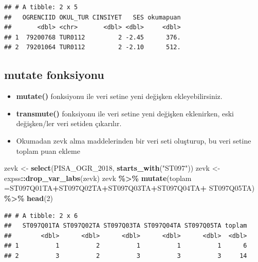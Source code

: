 \documentclass[
  oneside]{book}
\newenvironment{Shaded}{\begin{snugshade}}{\end{snugshade}}
\newcommand{\AttributeTok}[1]{\textcolor[rgb]{0.13,0.29,0.53}{#1}}
\newcommand{\DecValTok}[1]{\textcolor[rgb]{0.00,0.00,0.81}{#1}}
\newcommand{\FunctionTok}[1]{\textcolor[rgb]{0.13,0.29,0.53}{\textbf{#1}}}
\newcommand{\NormalTok}[1]{#1}
\newcommand{\OtherTok}[1]{\textcolor[rgb]{0.56,0.35,0.01}{#1}}
\newcommand{\SpecialCharTok}[1]{\textcolor[rgb]{0.81,0.36,0.00}{\textbf{#1}}}
\newcommand{\StringTok}[1]{\textcolor[rgb]{0.31,0.60,0.02}{#1}}
\begin{document}
\begin{verbatim}
## # A tibble: 2 x 5
##   OGRENCIID OKUL_TUR CINSIYET   SES okumapuan
##       <dbl> <chr>       <dbl> <dbl>     <dbl>
## 1  79200768 TUR0112         2 -2.45      376.
## 2  79201064 TUR0112         2 -2.10      512.
\end{verbatim}

\hypertarget{mutate-fonksiyonu}{%
\subsection{mutate fonksiyonu}\label{mutate-fonksiyonu}}

\begin{itemize}
\item
  \textbf{mutate()} fonksiyonu ile veri setine yeni değişken ekleyebilirsiniz.
\item
  \textbf{transmute()} fonksiyonu ile veri setine yeni değişken eklenirken, eski değişken/ler veri setiden çıkarılır.
\item
  Okumadan zevk alma maddelerinden bir veri seti oluşturup, bu veri setine toplam puan ekleme
\end{itemize}

\begin{Shaded}
\begin{Highlighting}[]
\NormalTok{zevk  }\OtherTok{\textless{}{-}} \FunctionTok{select}\NormalTok{(PISA\_OGR\_2018, }\FunctionTok{starts\_with}\NormalTok{(}\StringTok{"ST097"}\NormalTok{))}
\NormalTok{zevk  }\OtherTok{\textless{}{-}}\NormalTok{ expss}\SpecialCharTok{::}\FunctionTok{drop\_var\_labs}\NormalTok{(zevk)}
\NormalTok{zevk }\SpecialCharTok{\%\textgreater{}\%}
\FunctionTok{mutate}\NormalTok{(}\AttributeTok{toplam =}\NormalTok{ST097Q01TA}\SpecialCharTok{+}\NormalTok{ST097Q02TA}\SpecialCharTok{+}\NormalTok{ST097Q03TA}\SpecialCharTok{+}\NormalTok{ST097Q04TA}\SpecialCharTok{+}\NormalTok{ ST097Q05TA) }\SpecialCharTok{\%\textgreater{}\%} \FunctionTok{head}\NormalTok{(}\DecValTok{2}\NormalTok{)}
\end{Highlighting}
\end{Shaded}

\begin{verbatim}
## # A tibble: 2 x 6
##   ST097Q01TA ST097Q02TA ST097Q03TA ST097Q04TA ST097Q05TA toplam
##        <dbl>      <dbl>      <dbl>      <dbl>      <dbl>  <dbl>
## 1          1          2          1          1          1      6
## 2          3          2          3          3          3     14
\end{verbatim}
\end{document}
